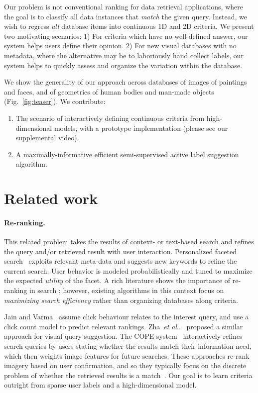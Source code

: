 \documentclass{article}
\makeatletter
\DeclareRobustCommand\onedot{\futurelet\@let@token\@onedot}
\def\@onedot{\ifx\@let@token.\else.\null\fi\xspace}
\def\etal{\emph{et al}\onedot}
\makeatother
\begin{document}
Our problem is not conventional ranking for data retrieval applications, where the goal is to classify all data instances that \emph{match} the given query. Instead, we wish to regress \emph{all} database items into continuous 1D and 2D criteria. We present two motivating scenarios: 1) For criteria which have no well-defined answer, our system helps users define their opinion. 2) For new visual databases with no metadata, where the alternative may be to laboriously hand collect labels, our system helps to quickly assess and organize the variation within the database.

We show the generality of our approach across databases of images of paintings and faces, and of geometries of human bodies and man-made objects (Fig.~\ref{fig:teaser}). We contribute:
\begin{enumerate} \itemsep0pt
\item The scenario of interactively defining continuous criteria from high-dimensional models, with a prototype implementation (please see our supplemental video).
\item A maximally-informative efficient semi-supervised active label suggestion algorithm.
\end{enumerate}

\section{Related work}
\paragraph{Re-ranking.}
This related problem takes the results of context- or text-based search and refines the query and/or retrieved result with user interaction. Personalized faceted search~\cite{KorZhaLiu08} exploits relevant meta-data and suggests new keywords to refine the current search. User behavior is modeled probabilistically and tuned to maximize the expected \emph{utility} of the facet. A rich literature shows the importance of re-ranking in search \cite{KorZhaLiu08}; however, existing algorithms in this context focus on \emph{maximizing search efficiency} rather than organizing databases along criteria.

Jain and Varma~\cite{JaiVar11} assume click behaviour relates to the interest query, and use a click count model to predict relevant rankings. Zha~\etal~\cite{ZhaYanMei10} proposed a similar approach for visual query suggestion. The COPE system~\cite{BalHalJos12} interactively refines search queries by users stating whether the results match their information need, which then weights image features for future searches. These approaches re-rank imagery based on user confirmation, and so they typically focus on the discrete problem of whether the retrieved results is a match~\cite{KorZhaLiu08}. Our goal is to learn criteria outright from sparse user labels and a high-dimensional model.
\end{document}

